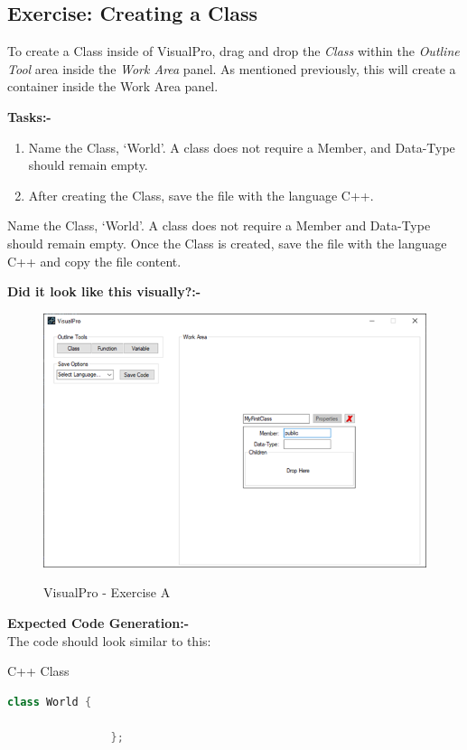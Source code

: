 \documentclass[10pt]{article}
\begin{document}
    \newpage
    \subsection{Exercise: Creating a Class}
        To create a Class inside of VisualPro, drag and drop the \textit{Class} within the \textit{Outline Tool} area inside the \textit{Work Area} panel. As mentioned previously, this will create a container inside the Work Area panel.

        \textbf{Tasks:-}
        \begin{enumerate}
            \item Name the Class, `World'. A class does not require a Member, and Data-Type should remain empty.
            \item After creating the Class, save the file with the language C++.
        \end{enumerate}
        Name the Class, `World'. A class does not require a Member and Data-Type should remain empty. Once the Class is created, save the file with the language C++ and copy the file content.

        \textbf{Did it look like this visually?:-}
            \begin{figure}[h]
                \centering
                {\includegraphics[scale=0.75]{Figures/Exercises/SecB-1.png}}
                \caption{VisualPro - Exercise A}
                \label{fig:vp-eA}
            \end{figure}

        \textbf{Expected Code Generation:-}\\
        The code should look similar to this:
        \begin{example}{C++ Class}
            \begin{lstlisting}[language=c++]
                class World {

                };
            \end{lstlisting}
        \end{example}
\end{document}
